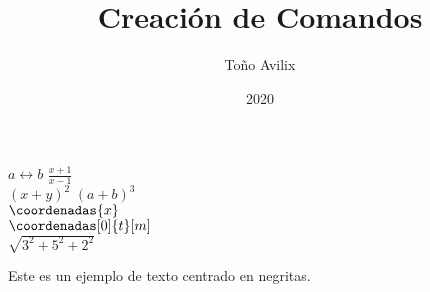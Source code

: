 \documentclass{article}
\title{Creación de Comandos}
\author{Toño Avilix}
\date{2020}
\newcommand{\lla}{\longleftrightarrow}
\newcommand{\ds}[1]{\displaystyle{#1}}
\newcommand{\binomio}[3][2]{(#2+#3)^#1}
\def\normatres(#1,#2,#3){\sqrt{#1^2+#2^2+#3^2}}
\newenvironment{mientorno}[1][0.7]
{
    \begin{center}
        \begin{minipage}    
            {#1\textwidth}\bfseries
}
{
        \end{minipage}
    \end{center}
}
\begin{document}
\maketitle
$a \lla b$ $\ds{\frac{x+1}{x-1}}$\\
$\binomio{x}{y}$ $\binomio[3]{a}{b}$\\
$\coordenadas{x}$\\
$\coordenadas[0]{t}[m]$\\
$\normatres(3,5,2)$
\begin{mientorno}[0.4]
    Este es un ejemplo de texto centrado en negritas.
\end{mientorno}
\end{document}
